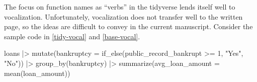 \documentclass[12pt]{article}
\newenvironment{Shaded}{\begin{snugshade}}{\end{snugshade}}
\newcommand{\AttributeTok}[1]{\textcolor[rgb]{0.77,0.63,0.00}{#1}}
\newcommand{\DecValTok}[1]{\textcolor[rgb]{0.00,0.00,0.81}{#1}}
\newcommand{\FunctionTok}[1]{\textcolor[rgb]{0.00,0.00,0.00}{#1}}
\newcommand{\NormalTok}[1]{#1}
\newcommand{\OtherTok}[1]{\textcolor[rgb]{0.56,0.35,0.01}{#1}}
\newcommand{\SpecialCharTok}[1]{\textcolor[rgb]{0.00,0.00,0.00}{#1}}
\newcommand{\StringTok}[1]{\textcolor[rgb]{0.31,0.60,0.02}{#1}}
\begin{document}
The focus on function names as ``verbs'' in the tidyverse lends itself
well to vocalization. Unfortunately, vocalization does not transfer well
to the written page, so the ideas are difficult to convey in the current
manuscript. Consider the sample code in \ref{tidy-vocal} and
\ref{base-vocal}.

\linespread{1}

\begin{Shaded}
\begin{Highlighting}[]
\NormalTok{loans }\SpecialCharTok{|\textgreater{}}
  \FunctionTok{mutate}\NormalTok{(}\AttributeTok{bankruptcy =} \FunctionTok{if\_else}\NormalTok{(public\_record\_bankrupt }\SpecialCharTok{\textgreater{}=} \DecValTok{1}\NormalTok{, }\StringTok{"Yes"}\NormalTok{, }\StringTok{"No"}\NormalTok{)) }\SpecialCharTok{|\textgreater{}}
  \FunctionTok{group\_by}\NormalTok{(bankruptcy) }\SpecialCharTok{|\textgreater{}}
  \FunctionTok{summarize}\NormalTok{(}\AttributeTok{avg\_loan\_amount =} \FunctionTok{mean}\NormalTok{(loan\_amount))}
\end{Highlighting}
\end{Shaded}


\label{tidy-vocal} \linespread{2}
\vspace{3mm}\setlength{\parindent}{15pt}

\linespread{1}

\begin{Shaded}
\end{Shaded}


\label{base-vocal} \linespread{2}
\vspace{3mm}\setlength{\parindent}{15pt}
\end{document}
